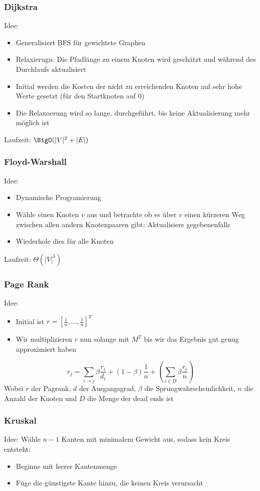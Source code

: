 	\subsubsection{Dijkstra}
		Idee:
		\begin{itemize}
		  \item Generalisiert BFS für gewichtete Graphen
		  \item Relaxierugn: Die Pfadlänge zu einem Knoten wird geschätzt und während des Durchlaufs aktualisiert 
		  \item Initial werden die Kosten der nicht zu erreichenden Knoten auf sehr hohe Werte gesetzt (für den Startknoten auf 0) 
		  \item Die Relaxoerung wird so lange. durchgeführt, bis keine Aktualisierung mehr möglich ist
		\end{itemize}
		Laufzeit: $\BigO(|V|^2+|E|)$
	\subsubsection{Floyd-Warshall}
		Idee:
		\begin{itemize}
		  \item Dynamische Programierung
		  \item Wähle einen Knoten $v$ aus und betrachte ob es über $v$ einen kürzeren Weg zwischen allen andern Knotenpaaren gibt: Aktualisiere gegebenenfalls 
		  \item Wiederhole dies für alle Knoten
		\end{itemize}
		Laufzeit: $\Theta(|V|^3)$
	\subsubsection{Page Rank}
	Idee: 
	\begin{itemize}
	  \item Initial ist $r=[\frac{1}{n},...,\frac{1}{n}]^T$
	  \item Wir multiplizieren $r$ nun solange mit $M^T$ bis wir das Ergebnis gut genug approximiert haben
	\end{itemize}
	$$
		r_j=\displaystyle\sum_{i\to j}\beta\frac{r_i}{d_i}+(1-\beta)\frac{1}{n}+(\displaystyle\sum_{i\in D}\beta\frac{r_i}{n})
	$$
	Wobei $r$ der Pagrank, $d$ der Ausgangsgrad, $\beta$ die Sprungwahrscheinlichkeit, $n$ die Anzahl der Knoten und $D$ die Menge der dead ends ist
	\subsubsection{Kruskal}
	Idee: Wähle $n-1$ Kanten mit minimalem Gewicht aus, sodass kein Kreis entsteht:
	\begin{itemize}
	  \item Beginne mit leerer Kantenmenge
	  \item Füge die günstigste Kante hinzu, die keinen Kreis verursacht
	\end{itemize}
